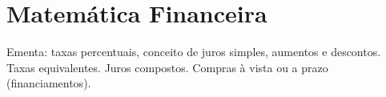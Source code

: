\chapter{Matemática Financeira}
Ementa: taxas percentuais, conceito de juros simples, aumentos e descontos. Taxas equivalentes. Juros compostos. Compras à vista ou a prazo (financiamentos).
